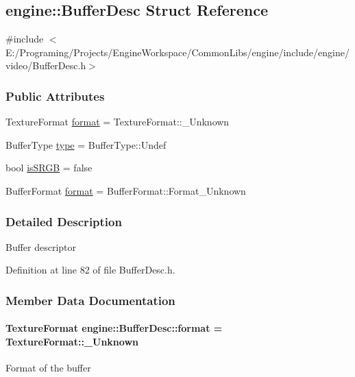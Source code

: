 \hypertarget{a00007}{}\subsection{engine\+:\+:Buffer\+Desc Struct Reference}
\label{a00007}


{\ttfamily \#include $<$E\+:/\+Programing/\+Projects/\+Engine\+Workspace/\+Common\+Libs/engine/include/engine/video/\+Buffer\+Desc.\+h$>$}

\subsubsection*{Public Attributes}
\begin{DoxyCompactItemize}
\item 
Texture\+Format \hyperlink{a00007_a5a84b0faa10bdbcd51ddb3936295d82c}{format} = Texture\+Format\+::\+\_\+\+Unknown
\item 
Buffer\+Type \hyperlink{a00007_aaac2389a71fd61b51cd539da66fbc240}{type} = Buffer\+Type\+::\+Undef
\item 
bool \hyperlink{a00007_a50a45012458646eb58890de16c6f5fae}{is\+S\+R\+GB} = false
\item 
Buffer\+Format \hyperlink{a00007_a99d4db16d6b3d3bbb5da5ac64610bb3a}{format} = Buffer\+Format\+::\+Format\+\_\+\+Unknown
\end{DoxyCompactItemize}


\subsubsection{Detailed Description}
Buffer descriptor 

Definition at line 82 of file Buffer\+Desc.\+h.



\subsubsection{Member Data Documentation}
\paragraph[{\texorpdfstring{format}{format}}]{\setlength{\rightskip}{0pt plus 5cm}Texture\+Format engine\+::\+Buffer\+Desc\+::format = Texture\+Format\+::\+\_\+\+Unknown}\hypertarget{a00007_a5a84b0faa10bdbcd51ddb3936295d82c}{}\label{a00007_a5a84b0faa10bdbcd51ddb3936295d82c}
Format of the buffer 

